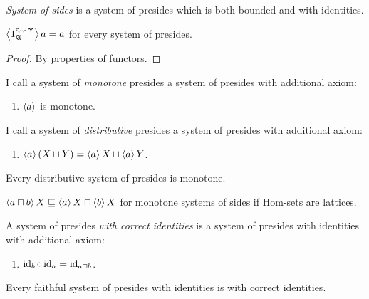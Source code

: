 \begin{defn}
\emph{System of sides} is a system of presides which is both bounded and with identities.
\end{defn}

\begin{prop}
$\left\langle 1^{\operatorname{Src}\Upsilon}_\mathfrak{A}\right\rangle a = a$ for every system of presides.
\end{prop}

\begin{proof}
By properties of functors.
\end{proof}

\begin{defn}
I call a system of \emph{monotone} presides a system of presides with additional axiom:
\begin{enumerate}
\item $\left\langle a\right\rangle$ is monotone.
\end{enumerate}
\end{defn}

\begin{defn}
I call a system of \emph{distributive} presides a system of presides with additional axiom:
\begin{enumerate}
\item $\left\langle a\right\rangle(X\sqcup Y) = \left\langle a\right\rangle X\sqcup\left\langle a\right\rangle Y$.
\end{enumerate}
\end{defn}

\begin{obvious}
Every distributive system of presides is monotone.
\end{obvious}

\begin{prop}
$\left\langle a \sqcap b\right\rangle X \sqsubseteq \left\langle a\right\rangle X \sqcap \left\langle b\right\rangle X$ for monotone systems of sides
if Hom-sets are lattices.
\end{prop}

\begin{defn}
A system of presides \emph{with correct identities} is a system of presides with identities with additional axiom:
\begin{enumerate}
\item $\operatorname{id}_b\circ\operatorname{id}_a = \operatorname{id}_{a\sqcap b}$.
\end{enumerate}
\end{defn}

\begin{prop}
Every faithful system of presides with identities is with correct identities.
\end{prop}

